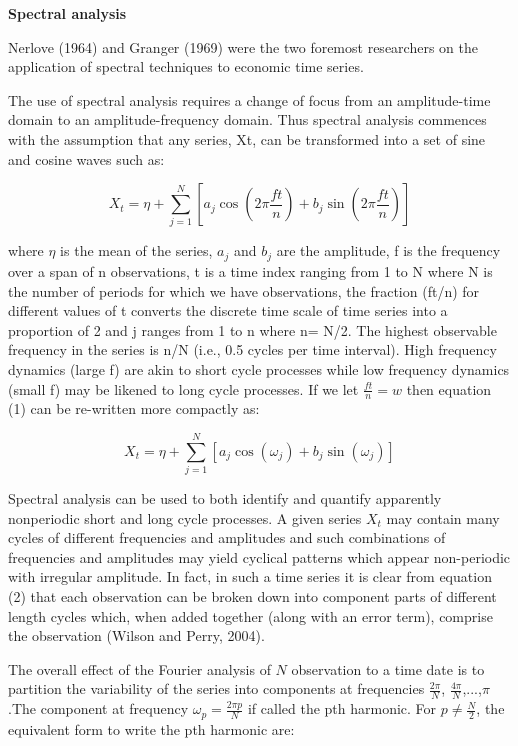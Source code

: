 \documentclass{article}\usepackage[]{graphicx}\usepackage[]{color}
\begin{document}
{\bf Spectral analysis}

Nerlove (1964) and Granger (1969) were the two foremost researchers on the application of spectral techniques to economic time series. 

The use of spectral analysis requires a change of focus from an amplitude-time domain to an amplitude-frequency domain. Thus spectral analysis commences with the assumption that any series, {Xt}, can be transformed into a set of sine and cosine waves such as:

\begin{equation}
    X_t=\eta+\sum_{j=1}^N[a_j\cos(2\pi\frac{ft}n)+b_j\sin(2\pi\frac{ft}n)]
    \end{equation}

where $\eta$ is the mean of the series, $a_j$ and $b_j$  are the amplitude, f is the frequency over a span of n observations, t is a time index ranging from 1 to N where N is the number of periods for which we have observations, the fraction (ft/n) for different values of t converts the discrete time scale of time series into a proportion of 2 and j ranges from 1 to n where n= N/2. The highest observable frequency in the series is n/N (i.e., 0.5 cycles per time interval). High frequency dynamics (large f) are akin to short cycle processes while low frequency dynamics (small f) may be likened to long cycle processes. If we let $ \frac{ft}n=w $  then equation (1) can be re-written more compactly as:

\begin{equation}
    X_t=\eta+\sum_{j=1}^N[a_j\cos(\omega_j)+b_j\sin(\omega_j)]
    \end{equation}

Spectral analysis can be used to both identify and quantify apparently nonperiodic short and long cycle processes. A given series ${X_t}$ may contain many cycles of different frequencies and amplitudes and such combinations of frequencies and amplitudes may yield cyclical patterns which appear non-periodic with irregular amplitude. In fact, in such a time series it is clear from equation (2) that each observation can be broken down into component parts of different length cycles which, when added together (along with an error term), comprise the observation (Wilson and Perry, 2004). 

The overall effect of the Fourier analysis of $N$ observation to a time date  is to partition the variability of the series into components at frequencies $\frac{2\pi}{N}$,  $\frac{4\pi}{N}$,...,$\pi$.The component at frequency $\omega_p=\frac{2\pi p}{N}$ if called the pth harmonic. For $p\neq \frac{N}{2}$, the equivalent form to write the pth harmonic are:
\end{document}
